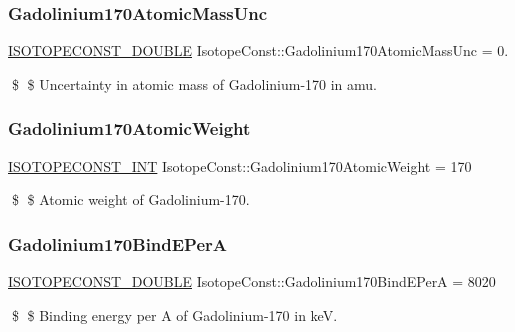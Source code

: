 \subsubsection{\texorpdfstring{Gadolinium170\+Atomic\+Mass\+Unc}{Gadolinium170AtomicMassUnc}}
{\footnotesize\ttfamily \mbox{\hyperlink{group___isotope_const-_macros_ga8f45a7272ce02c0b4c65c44636ed719a}{I\+S\+O\+T\+O\+P\+E\+C\+O\+N\+S\+T\+\_\+\+D\+O\+U\+B\+LE}} Isotope\+Const\+::\+Gadolinium170\+Atomic\+Mass\+Unc = 0.}

\$ \$ Uncertainty in atomic mass of Gadolinium-\/170 in amu. \mbox{\label{group___isotope_const-_gadolinium-_gd170_ga754c58b5358a418ef04fb7f54f506574}} 
\subsubsection{\texorpdfstring{Gadolinium170\+Atomic\+Weight}{Gadolinium170AtomicWeight}}
{\footnotesize\ttfamily \mbox{\hyperlink{group___isotope_const-_macros_ga5f18360b3e99483a35c32d789e62621c}{I\+S\+O\+T\+O\+P\+E\+C\+O\+N\+S\+T\+\_\+\+I\+NT}} Isotope\+Const\+::\+Gadolinium170\+Atomic\+Weight = 170}

\$ \$ Atomic weight of Gadolinium-\/170. \mbox{\label{group___isotope_const-_gadolinium-_gd170_ga9da01bbd5802e8cc9a9de8f485a8322d}} 
\subsubsection{\texorpdfstring{Gadolinium170\+Bind\+E\+PerA}{Gadolinium170BindEPerA}}
{\footnotesize\ttfamily \mbox{\hyperlink{group___isotope_const-_macros_ga8f45a7272ce02c0b4c65c44636ed719a}{I\+S\+O\+T\+O\+P\+E\+C\+O\+N\+S\+T\+\_\+\+D\+O\+U\+B\+LE}} Isotope\+Const\+::\+Gadolinium170\+Bind\+E\+PerA = 8020}

\$ \$ Binding energy per A of Gadolinium-\/170 in keV. \mbox{\label{group___isotope_const-_gadolinium-_gd170_ga272d820ba6b96e75cbf51b8c0a7cece4}} 
